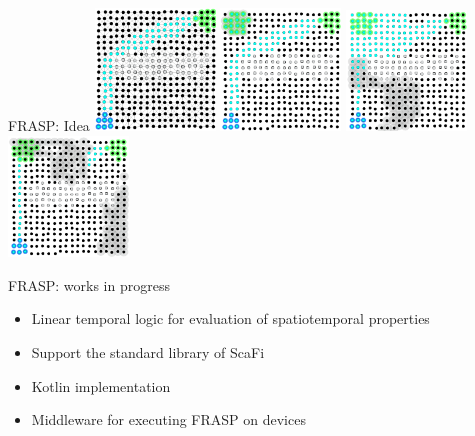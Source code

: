 \documentclass[presentation, 9pt, aspectratio=169]{beamer}\mode<presentation>{\usetheme{AMSBolognaFC}}
\begin{document}
\begin{frame}{FRASP: Idea}
	\includegraphics[width=0.24\textwidth]{img/start.png}
	\includegraphics[width=0.24\textwidth]{img/middle.png}
	\includegraphics[width=0.24\textwidth]{img/middle-2.png}
	\includegraphics[width=0.24\textwidth]{img/end.png}
\end{frame}
\begin{frame}{FRASP: works in progress}
	\begin{exampleblock}
		
	\begin{itemize}
		\item Linear temporal logic for evaluation of spatiotemporal properties
		\item Support the standard library of ScaFi
		\item Kotlin implementation
		\item Middleware for executing FRASP on devices
	\end{itemize}
	\end{exampleblock}
\end{frame}
\end{document}
